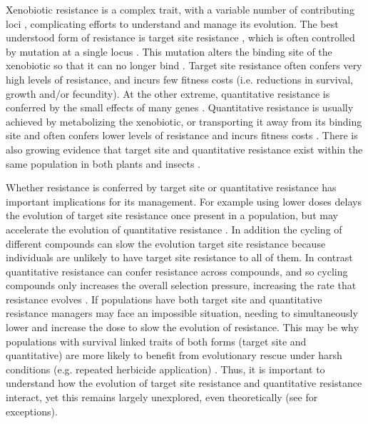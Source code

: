 \documentclass[10pt,letterpaper]{article}
\begin{document}
Xenobiotic resistance is a complex trait, with a variable number of contributing loci \cite{Warw1991, Neve2007, Dely2013, Bauc2016}, complicating efforts to understand and manage its evolution. The best understood form of resistance is target site resistance \cite{Warw1991, Neve2007, Dely2013, Serv2013}, which is often controlled by mutation at a single locus \cite{Bauc2016}. This mutation alters the binding site of the xenobiotic so that it can no longer bind \cite{Dely2013, Bauc2016}. Target site resistance often confers very high levels of resistance, and incurs few fitness costs (i.e. reductions in survival, growth and/or fecundity)\cite{Warw1994, Vila2005, Bauc2016}. At the other extreme, quantitative resistance is conferred by the small effects of many genes \cite{Land1989, Mack2009, Dely2013, Rajo2013}. Quantitative resistance is usually achieved by metabolizing the xenobiotic, or transporting it away from its binding site \cite{Dely2013, Bauc2016} and often confers lower levels of resistance and incurs fitness costs \cite{Vila2005, Bauc2016}. There is also growing evidence that target site and quantitative resistance exist within the same population in both plants \cite{Warw1991, Vila2005, Herr2014, Han2016} and insects \cite{Gard1998, Donn2009, Bing2011, Hend2013, Oake2013}.

Whether resistance is conferred by target site or quantitative resistance has important implications for its management. For example using lower doses delays the evolution of target site resistance once present in a population, but may accelerate the evolution of quantitative resistance \cite{Gard1998}.
In addition the cycling of different compounds can slow the evolution target site resistance because individuals are unlikely to have target site resistance to all of them. In contrast quantitative resistance can confer resistance across compounds, and so cycling compounds only increases the overall selection pressure, increasing the rate that resistance evolves \cite{Mena2016}. If populations have both target site and quantitative resistance managers may face an impossible situation, needing to simultaneously lower and increase the dose to slow the evolution of resistance. This may be why populations with survival linked traits of both forms (target site and quantitative) are more likely to benefit from evolutionary rescue under harsh conditions (e.g. repeated herbicide application) \cite{Gomu2010}. Thus, it is important to understand how the evolution of target site resistance and quantitative resistance interact, yet this remains largely unexplored, even theoretically (see \cite{Gomu2010, Deba2015, Yeam2015} for exceptions). 
\end{document}
